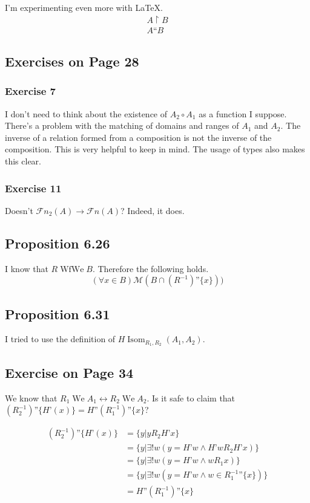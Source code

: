 \documentclass{article}
\DeclareMathOperator{\We}{We}
\DeclareMathOperator{\WfWe}{WfWe}
\DeclareMathOperator{\Isom}{Isom}
\newcommand{\RelationLessThan}[2]{(#1^{-1})\text{''}\{#2\}}
\newcommand{\RLessThan}[1]{\RelationLessThan{R}{#1}}
\begin{document}
I'm experimenting even more with \LaTeX{}.
\begin{align*}
  A \restriction B \\
  A\text{``}B
\end{align*}

\subsection{Exercises on Page 28}

\subsubsection{Exercise 7}

I don't need to think about the existence of \(A_2 \circ A_1\) as a function I
suppose. There's a problem with the matching of domains and ranges of \(A_1\)
and \(A_2\). The inverse of a relation formed from a composition is not the
inverse of the composition. This is very helpful to keep in mind. The usage of
types also makes this clear.

\subsubsection{Exercise 11}
Doesn't \(\mathscr{F}\mathit{n}_2(A) \rightarrow \mathscr{F}\mathit{n}(A)\)?
Indeed, it does.

\subsection{Proposition 6.26}
I know that \(R \WfWe B\). Therefore the following holds.
\[
  (\forall x \in B) \mathscr{M}(B \cap \RLessThan{x}))
\]

\subsection{Proposition 6.31}
I tried to use the definition of \(H \Isom_{R_1, R_2}(A_1, A_2)\).

\subsection{Exercise on Page 34}
We know that \(R_1 \We A_1 \leftrightarrow R_2 \We A_2\). Is it safe to claim
that \((R_2^{-1})\text{''}\{H\text{'}(x)\} =
  H\text{''}(R_1^{-1})\text{''}\{x\}\)?

\begin{align*}
  (R_2^{-1})\text{''}\{H\text{'}(x)\} &= \{y \vert y R_2 H\text{'}x\} \\
  &= \{y \vert \exists! w (y = H\text{'}w \wedge
      H\text{'}w R_2 H\text{'}x) \} \\
  &= \{y \vert \exists! w (y = H\text{'}w \wedge
      w R_1 x) \} \\
  &= \{y \vert \exists! w (y = H\text{'}w \wedge
      w \in R_1^{-1}\text{''}\{x\}) \} \\
  &= H\text{''}(R_1^{-1})\text{''}\{x\}
\end{align*}
\end{document}
